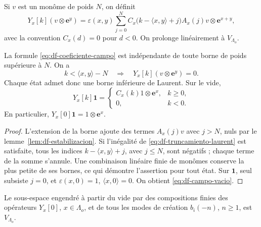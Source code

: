 \begin{definition}
Si \(v\) est un monôme de poids \(N\), on définit
\begin{equation}
 Y_x[k](v\otimes\mathbf e^y)
 =\varepsilon(x,y)
 \sum_{j=0}^{N}
 C_x\bigl(k-\langle x,y\rangle+j\bigr)A_x(j)v
       \otimes\mathbf e^{x+y},
 \label{eq:df-coeficiente-campo}
\end{equation}
avec la convention \(C_x(d)=0\) pour \(d<0\). On prolonge linéairement à \(V_{\Lambda_o}\).
\end{definition}

\begin{theorem}
\label{thm:df-campo-truncamiento} La formule \eqref{eq:df-coeficiente-campo} est indépendante de toute borne de poids supérieure à \(N\). On a
\begin{equation}
 k<\langle x,y\rangle-N
 \quad\Longrightarrow\quad
 Y_x[k](v\otimes\mathbf e^y)=0.
 \label{eq:df-truncamiento-laurent}
\end{equation}
Chaque état admet donc une borne inférieure de Laurent. Sur le vide,
\begin{equation}
 Y_x[k]\mathbf1=
 \begin{cases}
 C_x(k)1\otimes\mathbf e^x,&k\geq0,\\
 0,&k<0.
 \end{cases}
 \label{eq:df-campo-vacio}
\end{equation}
En particulier, \(Y_x[0]\mathbf1=1\otimes\mathbf e^x\).
\end{theorem}

\begin{proof}
L’extension de la borne ajoute des termes \(A_x(j)v\) avec \(j>N\), nuls par le lemme~\ref{lem:df-estabilizacion}. Si l’inégalité de \eqref{eq:df-truncamiento-laurent} est satisfaite, tous les indices \(k-\langle x,y\rangle+j\), avec \(j\leq N\), sont négatifs ; chaque terme de la somme s’annule. Une combinaison linéaire finie de monômes conserve la plus petite de ses bornes, ce qui démontre l’assertion pour tout état. Sur \(\mathbf1\), seul subsiste \(j=0\), et \(\varepsilon(x,0)=1\), \(\langle x,0\rangle=0\). On obtient \eqref{eq:df-campo-vacio}.
\end{proof}

\begin{theorem}
\label{thm:df-generacion-campos} Le sous-espace engendré à partir du vide par des compositions finies des opérateurs \(Y_x[0]\), \(x\in\Lambda_o\), et de tous les modes de création \(b_i(-n)\), \(n\geq1\), est \(V_{\Lambda_o}\).
\end{theorem}

